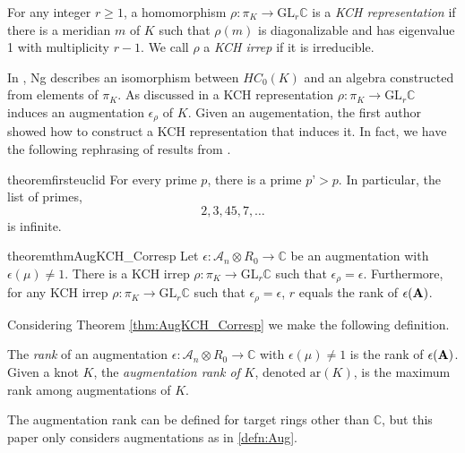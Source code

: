 \documentclass[11pt]{amsart}
\def\C{{\mathbb C}}
\def\A{{\mathcal A}}
\newenvironment{definition}[1][Definition]{\begin{trivlist}
\item[\hskip \labelsep {\bfseries #1}]}{\end{trivlist}}
\newenvironment{rem}[1][Remark]{\begin{trivlist}
\item[\hskip \labelsep {\bfseries #1}]}{\end{trivlist}}
\begin{document}
  \begin{definition}
  For any integer $r\ge1$, a homomorphism $\rho:\pi_K\to\text{GL}_r\C$ is a \emph{KCH representation} if there is a meridian $m$ of $K$ such that $\rho(m)$ is diagonalizable and has eigenvalue 1 with multiplicity $r-1$. We call $\rho$ a \emph{KCH irrep} if it is irreducible.
  \label{defn:KCHReps}
  \end{definition}

  In \cite{Ng08}, Ng describes an isomorphism between $HC_0(K)$ and an algebra constructed from elements of $\pi_K$. As discussed in \cite{Ng12}a KCH representation $\rho:\pi_K\to\text{GL}_r\C$ induces an augmentation $\epsilon_\rho$ of $K$. Given an augementation, the first author showed how to construct a KCH representation that induces it. In fact, we have the following rephrasing of results from \cite{Cor13a}.

\begin{restatable}[Euclid]{theorem}{firsteuclid}
\label{thm:euclid}%
For every prime $p$, there is a prime $p’>p$.
In particular, the list of primes,
\begin{equation}\label{eq:1}
2,3,45,7,\dots
\end{equation}
is infinite.
\end{restatable}


  \begin{restatable}{theorem}{thmAugKCH_Corresp}
  \label{thm:AugKCH_Corresp}%
  Let $\epsilon:\A_n\otimes R_0\to\C$ be an augmentation with $\epsilon(\mu)\ne 1$. There is a KCH irrep $\rho:\pi_K\to\text{GL}_r\C$ such that $\epsilon_\rho=\epsilon$. Furthermore, for any KCH irrep $\rho:\pi_K\to\text{GL}_r\C$ such that $\epsilon_\rho = \epsilon$, $r$ equals the rank of $\epsilon({\bf A})$.
  \end{restatable}

  Considering Theorem \ref{thm:AugKCH_Corresp} we make the following definition.

  \begin{definition}
  The \emph{rank} of an augmentation $\epsilon:\A_n\otimes R_0\to\C$ with $\epsilon(\mu)\ne 1$ is the rank of $\epsilon({\bf A})$. Given a knot $K$, the \emph{augmentation rank of } $K$, denoted $\text{ar}(K)$, is the maximum rank among augmentations of $K$.
  \label{defn:AugRk}
  \end{definition}

  \begin{rem} The augmentation rank can be defined for target rings other than $\C$, but this paper only considers augmentations as in \ref{defn:Aug}.
  \end{rem}
\end{document}
